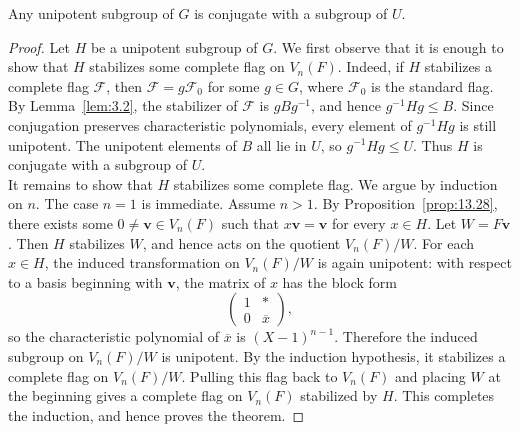 \documentclass[../Odyssey_Project.tex]{subfiles}
\begin{document}
\begin{namedtheorem}
\label{thm:kolchin}
Any unipotent subgroup of $G$ is conjugate with a subgroup of $U$.
\end{namedtheorem}
\begin{proof}
Let $H$ be a unipotent subgroup of $G$. We first observe that it is enough to show that $H$ stabilizes some complete flag on $V_n(F)$. Indeed, if $H$ stabilizes a complete flag $\mathcal{F}$, then $\mathcal{F}=g\mathcal{F}_0$ for some $g \in G$, where $\mathcal{F}_0$ is the standard flag. By Lemma~\ref{lem:3.2}, the stabilizer of $\mathcal{F}$ is $gBg^{-1}$, and hence $g^{-1}Hg \leq B$. Since conjugation preserves characteristic polynomials, every element of $g^{-1}Hg$ is still unipotent. The unipotent elements of $B$ all lie in $U$, so $g^{-1}Hg \leq U$. Thus $H$ is conjugate with a subgroup of $U$.\\
It remains to show that $H$ stabilizes some complete flag. We argue by induction on $n$. The case $n=1$ is immediate. Assume $n>1$. By Proposition~\ref{prop:13.28}, there exists some $0 \neq \mathbf{v} \in V_n(F)$ such that $x\mathbf{v}=\mathbf{v}$ for every $x \in H$. Let $W=F\mathbf{v}$. Then $H$ stabilizes $W$, and hence acts on the quotient $V_n(F)/W$. For each $x \in H$, the induced transformation on $V_n(F)/W$ is again unipotent: with respect to a basis beginning with $\mathbf{v}$, the matrix of $x$ has the block form
\[
    \begin{pmatrix}
        1 & * \\
        0 & \overline{x}
    \end{pmatrix},
\]
so the characteristic polynomial of $\overline{x}$ is $(X-1)^{n-1}$. Therefore the induced subgroup on $V_n(F)/W$ is unipotent. By the induction hypothesis, it stabilizes a complete flag on $V_n(F)/W$. Pulling this flag back to $V_n(F)$ and placing $W$ at the beginning gives a complete flag on $V_n(F)$ stabilized by $H$. This completes the induction, and hence proves the theorem.
\end{proof}
\end{document}

